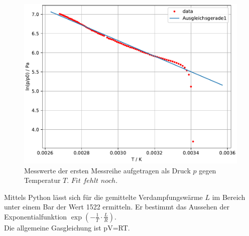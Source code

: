 \begin{figure}
  \centering
  \includegraphics[width=\textwidth]{plot_simon1.pdf}
  \caption{Messwerte der ersten Messreihe aufgetragen als Druck $p$ 
  gegen Temperatur $T$. $Fit\,\,fehlt\,\, noch$.}
\end{figure}
Mittels Python lässt sich für die gemittelte Verdampfungswärme $L$ im Bereich unter einem Bar der Wert
1522 ermitteln. Er bestimmt das Aussehen der Exponentialfunktion $\exp(-\frac{1}{T}\cdot\frac{L}{R})$.
\\
Die allgemeine Gasgleichung ist pV=RT. 
\newpage

